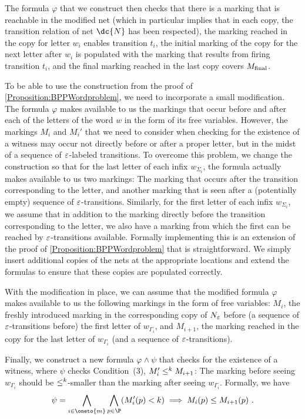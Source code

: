\documentclass[../../diss.tex]{subfiles}
\begin{document}
The formula $\varphi$ that we construct then checks that there is a marking that is reachable in the modified net (which in particular implies that in each copy, the transition relation of net $\dc{N}$ has been respected), the marking reached in the copy for letter $w_i$ enables transition $t_i$, the initial marking of the copy for the next letter after $w_i$ is populated with the marking that results from firing transition $t_i$,
and the final marking reached in the last copy covers $M_{\text{final}}$.

To be able to use the construction from the proof of \cref{Proposition:BPPWordproblem}, we need to incorporate a small modification.
The formula $\varphi$ makes available to us the markings that occur before and after each of the letters of the word $w$ in the form of its free variables.
However, the markings $M_i$ and $M_i'$ that we need to consider when checking for the existence of a witness may occur not directly before or after a proper letter, but in the midst of a sequence of $\varepsilon$-labeled transitions.
To overcome this problem, we change the construction so that for the last letter of each infix $w_{\Sigma_i}$, the formula actually makes available to us two markings:
The marking that occurs after the transition corresponding to the letter, and another marking that is seen after a (potentially empty) sequence of $\varepsilon$-transitions.
Similarly, for the first letter of each infix $w_{\Sigma_i}$, we assume that in addition to the marking directly before the transition corresponding to the letter, we also have a marking from which the first can be reached by $\varepsilon$-transitions available.
Formally implementing this is an extension of the proof of \cref{Proposition:BPPWordproblem} that is straightforward.
We simply insert additional copies of the nets at the appropriate locations and extend the formulas to ensure that these copies are populated correctly.

With the modification in place, we can assume that the modified formula $\varphi$ makes available to us the following markings in the form of free variables:
$M_i$, the freshly introduced marking in the corresponding copy of $N_\varepsilon$ before (a sequence of $\varepsilon$-transitions before) the first letter of $w_{\Gamma_i}$,
and $M_{i+1}$, the marking reached in the copy for the last letter of $w_{\Gamma_i}$ (and a sequence of $\varepsilon$-transitions).

Finally, we construct a new formula $\varphi \wedge \psi$ that checks for the existence of a witness, where $\psi$ checks Condition~(3), $M_i'\leq^k M_{i+1}$:
The marking before seeing $w_{\Gamma_i}$ should be $\leq^k$-smaller than the marking after seeing $w_{\Gamma_i}$.
Formally, we have
\[
    \psi = \bigwedge_{i \in \oneto{m}}
    \bigwedge_{p \in \P}
    (M_i'(p) < k)
    \implies
    M_i(p) \leq M_{i+1}(p)
    \ .
\]
\end{document}
